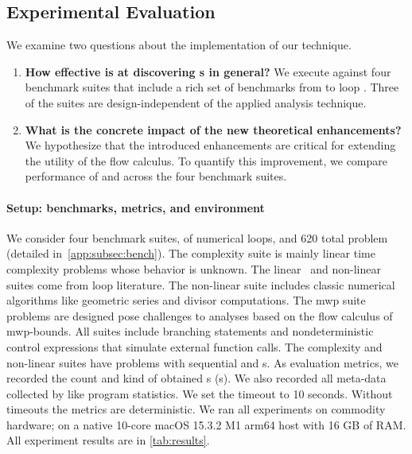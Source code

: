 \subsection{Experimental Evaluation}
\label{sec:performance}

We examine two questions about the implementation of our technique.

\begin{enumerate}

\item \textbf{How effective is \ndx{\impl} at discovering
s in general?}
We execute \ndx{\impl} against four benchmark suites that include a rich set
of benchmarks from  to loop
. Three of the suites are design-independent of the
applied analysis technique.

\item \textbf{What is the concrete impact of the new theoretical
enhancements?}
We hypothesize that the introduced enhancements are critical for extending
the utility of the flow calculus. To quantify this
improvement, we compare performance of \ndx{\impl} and \ndx{\impf} across
the four benchmark suites.

\end{enumerate}

\paragraph*{Setup: benchmarks, metrics, and environment}
\label{subsec:exp-setup}
We consider four benchmark suites, of numerical  loops, and 620 total problem (detailed in~\autoref{app:subsec:bench}). The
{complexity} suite is mainly linear time complexity problems whose
 behavior is unknown. The
{linear}~\cite{si2018} and
{non-linear}~\cite{nguyen2017,yu2023} suites come
from loop  literature. The
non-linear suite includes classic numerical algorithms like geometric series and
divisor computations. The {mwp} suite~\cite{aubert2023b} problems are designed
pose challenges to analyses based on the flow calculus of
mwp-bounds. All suites include branching statements and
nondeterministic control expressions that simulate
external function calls. The complexity and non-linear suites have problems with
sequential and s. As evaluation metrics, we recorded the count
and kind of obtained s (\ie {}s). We also
recorded all meta-data collected by  like program statistics. We set
the timeout to 10 seconds. Without timeouts the metrics are deterministic. We
ran all experiments on commodity hardware; on a native 10-core macOS 15.3.2 M1
arm64 host with 16 GB of RAM\@. All experiment results are in
\autoref{tab:results}.

